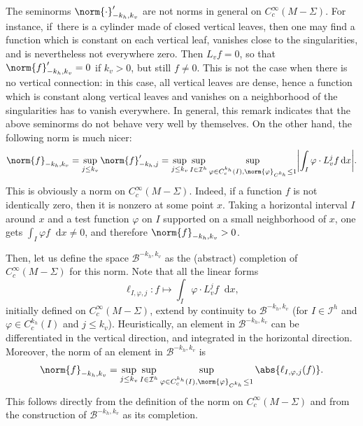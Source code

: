 \documentclass[JEP,XML,SOM,Unicode]{cedram}
\newcommand{\boI}{\mathcal{I}}
\newcommand{\boB}{\mathcal{B}}
\newcommand{\dd}{\mathop{}\!\mathrm{d}}
\newcommand{\absgg}[1]{\biggl \lvert#1\biggr\rvert}
\let\phi\varphi
\theoremstyle{definition}
\numberwithin{equation}{section}
\begin{document}
The seminorms $\norm{\cdot}'_{-k_h, k_v}$ are not norms in general on
$C^\infty_c(M-\Sigma)$. For instance, if~there is a cylinder made of closed
vertical leaves, then one may find a function which is constant on each
vertical leaf, vanishes close to the singularities, and is nevertheless not
everywhere zero. Then $L_v f= 0$, so that $\norm{f}'_{-k_h, k_v}=0$ if
$k_v>0$, but still $f \neq 0$. This is not the case when there is no vertical
connection: in this case, all vertical leaves are dense, hence a function
which is constant along vertical leaves and vanishes on a neighborhood of the
singularities has to vanish everywhere. In general, this remark indicates
that the above seminorms do not behave very well by themselves. On the other
hand, the following norm is much nicer:
\begin{equation}
\label{eq:define_norm}
\norm{f}_{-k_h, k_v} = \sup_{j\leq k_v} \norm{f}'_{-k_h, j}
= \sup_{j\leq k_v} \sup_{I \in \boI^h} \sup_{\phi \in C^{k_h}_c(I),
\norm{\phi}_{C^{k_h}} \leq 1} \absgg{\int_I \phi \cdot L_v^j f \dd x}.
\end{equation}
This is obviously a norm on $C^\infty_c(M-\Sigma)$. Indeed, if a function $f$
is not identically zero, then it is nonzero at some point $x$. Taking a
horizontal interval $I$ around $x$ and a test function $\phi$ on $I$
supported on a small neighborhood of $x$, one gets $\int_I \phi f \dd x \neq
0$, and therefore $\norm{f}_{-k_h, k_v}>0$.

Then, let us define the space $\boB^{-k_h, k_v}$ as the (abstract) completion
of $C^\infty_c(M-\Sigma)$ for this norm. Note that all the linear forms
\[
\ell_{I, \phi,j} : f \mapsto \int_I \phi \cdot L_v^j f \dd x,
\]
initially
defined on $C^\infty_c(M-\Sigma)$, extend by continuity to $\boB^{-k_h, k_v}$
(for $I \in \boI^h$ and $\phi \in C^{k_h}_c(I)$ and $j \leq k_v$).
Heuristically, an element in $\boB^{-k_h, k_v}$ can be differentiated in the
vertical direction, and integrated in the horizontal direction. Moreover, the
norm of an element in $\boB^{-k_h, k_v}$ is
\begin{equation}
\label{eq:norme_completion}
\norm{f}_{-k_h, k_v}
= \sup_{j\leq k_v} \sup_{I \in \boI^h} \sup_{\phi \in C^{k_h}_c(I),
\norm{\phi}_{C^{k_h}} \leq 1} \abs{\ell_{I,\phi, j}(f)}.
\end{equation}
This follows directly from the definition of the norm on
$C^\infty_c(M-\Sigma)$ and from the construction of $\boB^{-k_h, k_v}$ as its
completion.
\end{document}
